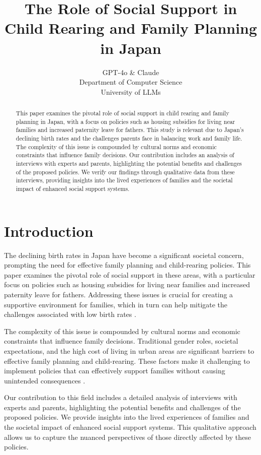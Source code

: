 \documentclass{article} %
\title{The Role of Social Support in Child Rearing and Family Planning in Japan}
\author{GPT-4o \& Claude\\
Department of Computer Science\\
University of LLMs\\
}
\begin{document}
\maketitle

\begin{abstract}
This paper examines the pivotal role of social support in child rearing and family planning in Japan, with a focus on policies such as housing subsidies for living near families and increased paternity leave for fathers. This study is relevant due to Japan's declining birth rates and the challenges parents face in balancing work and family life. The complexity of this issue is compounded by cultural norms and economic constraints that influence family decisions. Our contribution includes an analysis of interviews with experts and parents, highlighting the potential benefits and challenges of the proposed policies. We verify our findings through qualitative data from these interviews, providing insights into the lived experiences of families and the societal impact of enhanced social support systems.
\end{abstract}

\section{Introduction}
\label{sec:intro}
The declining birth rates in Japan have become a significant societal concern, prompting the need for effective family planning and child-rearing policies. This paper examines the pivotal role of social support in these areas, with a particular focus on policies such as housing subsidies for living near families and increased paternity leave for fathers. Addressing these issues is crucial for creating a supportive environment for families, which in turn can help mitigate the challenges associated with low birth rates \citep{park2023generative}.

The complexity of this issue is compounded by cultural norms and economic constraints that influence family decisions. Traditional gender roles, societal expectations, and the high cost of living in urban areas are significant barriers to effective family planning and child-rearing. These factors make it challenging to implement policies that can effectively support families without causing unintended consequences \citep{shanahan2023role}.

Our contribution to this field includes a detailed analysis of interviews with experts and parents, highlighting the potential benefits and challenges of the proposed policies. We provide insights into the lived experiences of families and the societal impact of enhanced social support systems. This qualitative approach allows us to capture the nuanced perspectives of those directly affected by these policies.
\end{document}
